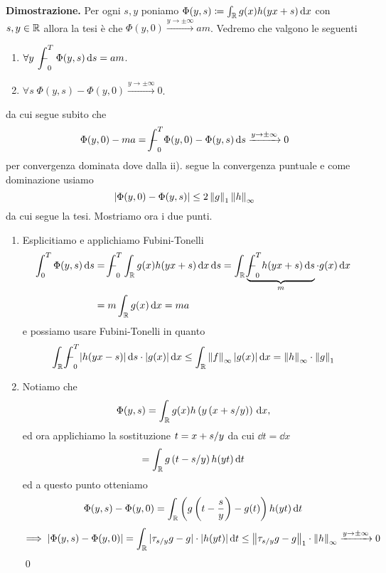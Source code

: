 \textbf{Dimostrazione.}
Per ogni $s, y$ poniamo $\Phi(y, s) \coloneqq \int_\mathbb R g(x) h(yx + s) \,\mathrm{d} x$ con $s, y \in \mathbb R$ allora la tesi è che $\Phi(y, 0) \xrightarrow{y \to \pm\infty} a m$.
Vedremo che valgono le seguenti
\begin{enumerate}
	\item $\forall y \; \ds \avint_0^T \Phi(y, s) \dd s = am$.
	\item $\forall s \; \Phi(y, s) - \Phi(y, 0) \xrightarrow{y \to \pm \infty} 0$.
\end{enumerate}
da cui segue subito che
$$
\Phi(y, 0) - ma = \avint_0^T \Phi(y, 0) - \Phi(y, s) \dd s \xrightarrow{y \to \pm \infty} 0
$$
per convergenza dominata dove dalla ii). segue la convergenza puntuale e come dominazione usiamo
$$
|\Phi(y, 0) - \Phi(y, s)| \leq 2 \left\lVert g \right\rVert_1 \left\lVert h \right\rVert_\infty
$$
da cui segue la tesi. Mostriamo ora i due punti.
\begin{enumerate}
	\item Esplicitiamo e applichiamo Fubini-Tonelli
		$$
		\begin{aligned}
			\int_0^T \Phi(y, s) \dd s
			&= \avint_0^T \int_\R g(x) h(yx + s) \dd x \dd s
			= \int_\R \underbrace{\avint_0^T h(yx + s) \dd s}_m \cdot g(x) \dd x \\
			&= m \int_\R g(x) \dd x = m a
		\end{aligned}
		$$
		e possiamo usare Fubini-Tonelli in quanto 
		$$
		\ds \int_\R \avint_0^T |h(yx - s)| \dd s \cdot |g(x)| \dd x \leq \int_\R \norm{f}_\infty |g(x)| \dd x = \norm{h}_\infty \cdot \norm{g}_1
		$$

	\item Notiamo che
		$$
		\Phi(y, s) 
		= \int_\mathbb R g(x) h\left(y \left( x + s/y \right)\right) \,\mathrm{d} x,
		$$
		ed ora applichiamo la sostituzione $\displaystyle t = x + s/y$ da cui $\dd t = \dd x$
		$$
		= \int_\mathbb R g \left( t - s/y \right) h(yt) \,\mathrm{d} t
		$$
		ed a questo punto otteniamo
		$$
		\Phi(y, s) - \Phi(y, 0) = \int_\mathbb R \left(g\left( t - \frac{s}{y}\right) - g(t) \right) h(yt) \,\mathrm{d} t 
		$$
		$$
		\implies
		|\Phi(y, s) - \Phi(y, 0)| = \int_\mathbb R |\tau_{s/y} g - g| \cdot |h(yt)| \,\mathrm{d} t
		\leq \left\lVert \tau_{s/y} g - g \right\rVert_1 \cdot \left\lVert h \right\rVert_\infty \xrightarrow{y \to \pm \infty} 0
		$$
\qed
\end{enumerate}

